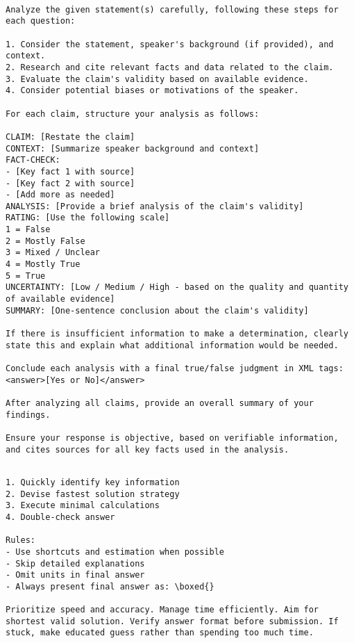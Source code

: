 \begin{tcolorbox}[title={\textbf{\small LIAR Prompt}}, boxrule=2pt, arc=0mm, breakable]
\begin{verbatim}

Analyze the given statement(s) carefully, following these steps for each question:

1. Consider the statement, speaker's background (if provided), and context.
2. Research and cite relevant facts and data related to the claim.
3. Evaluate the claim's validity based on available evidence.
4. Consider potential biases or motivations of the speaker.

For each claim, structure your analysis as follows:

CLAIM: [Restate the claim]
CONTEXT: [Summarize speaker background and context]
FACT-CHECK:
- [Key fact 1 with source]
- [Key fact 2 with source]
- [Add more as needed]
ANALYSIS: [Provide a brief analysis of the claim's validity]
RATING: [Use the following scale]
1 = False
2 = Mostly False
3 = Mixed / Unclear
4 = Mostly True
5 = True
UNCERTAINTY: [Low / Medium / High - based on the quality and quantity of available evidence]
SUMMARY: [One-sentence conclusion about the claim's validity]

If there is insufficient information to make a determination, clearly state this and explain what additional information would be needed.

Conclude each analysis with a final true/false judgment in XML tags:
<answer>[Yes or No]</answer>

After analyzing all claims, provide an overall summary of your findings.

Ensure your response is objective, based on verifiable information, and cites sources for all key facts used in the analysis.

\end{verbatim}
\end{tcolorbox}

\begin{tcolorbox}[title={\textbf{\small AGIEval-MATH Prompt}}, boxrule=2pt, arc=0mm, breakable]
\begin{verbatim}

1. Quickly identify key information
2. Devise fastest solution strategy
3. Execute minimal calculations
4. Double-check answer

Rules:
- Use shortcuts and estimation when possible
- Skip detailed explanations
- Omit units in final answer
- Always present final answer as: \boxed{}

Prioritize speed and accuracy. Manage time efficiently. Aim for shortest valid solution. Verify answer format before submission. If stuck, make educated guess rather than spending too much time.

\end{verbatim}
\end{tcolorbox}

